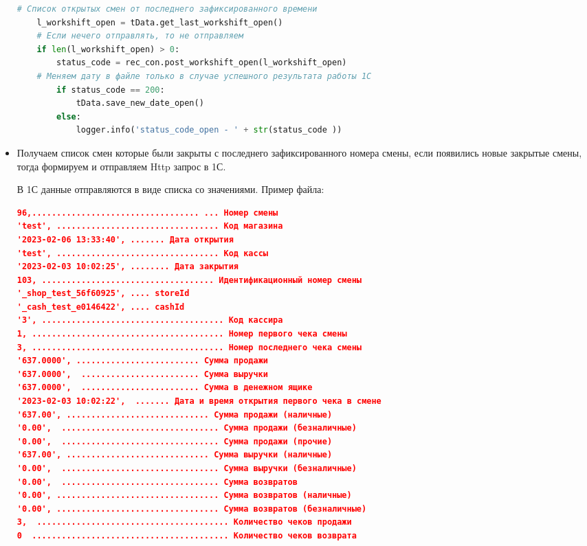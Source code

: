 \begin{itemize}
	\begin{lstlisting}[language=Python, caption=Обработка результата]
 # Список открытых смен от последнего зафиксированного времени
	l_workshift_open = tData.get_last_workshift_open()
	# Если нечего отправлять, то не отправляем
	if len(l_workshift_open) > 0:
		status_code = rec_con.post_workshift_open(l_workshift_open)
	# Меняем дату в файле только в случае успешного результата работы 1C
		if status_code == 200:
			tData.save_new_date_open()
		else:
			logger.info('status_code_open - ' + str(status_code ))
	\end{lstlisting}



\item Получаем список смен которые были закрыты с последнего зафиксированного номера смены, если появились новые закрытые смены, тогда формируем и отправляем Http запрос в 1С. 


В 1С данные отправляются в виде списка со значениями. Пример файла:

\begin{lstlisting}[language=json,firstnumber=1, caption= Формат файла закрытых смен]
96,.................................. ... Номер смены
'test', ................................. Код магазина
'2023-02-06 13:33:40', ....... Дата открытия 
'test', ................................. Код кассы
'2023-02-03 10:02:25', ........ Дата закрытия
103, ................................... Идентификационный номер смены
'_shop_test_56f60925', .... storeId
'_cash_test_e0146422', .... cashId
'3', ..................................... Код кассира
1, ....................................... Номер первого чека смены
3, ....................................... Номер последнего чека смены
'637.0000', ......................... Сумма продажи
'637.0000',  ........................ Сумма выручки
'637.0000',  ........................ Сумма в денежном ящике
'2023-02-03 10:02:22',  ....... Дата и время открытия первого чека в смене
'637.00', ............................. Сумма продажи (наличные)
'0.00',  ................................ Сумма продажи (безналичные)
'0.00',  ................................ Сумма продажи (прочие)
'637.00', ............................. Сумма выручки (наличные)
'0.00',  ................................ Сумма выручки (безналичные)
'0.00',  ................................ Сумма возвратов
'0.00', ................................. Сумма возвратов (наличные)
'0.00', ................................. Сумма возвратов (безналичные)
3,  ....................................... Количество чеков продажи
0  ........................................ Количество чеков возврата
\end{lstlisting}




\end{itemize}
